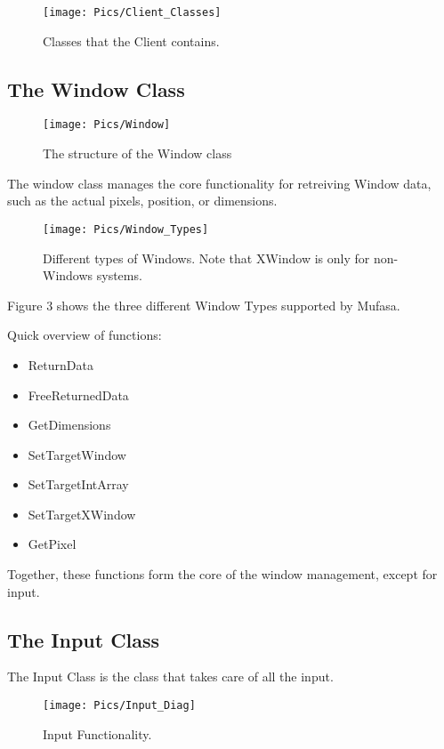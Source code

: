 \documentclass[a4paper, 10pt]{article}
\begin{document}
\begin{figure}[h]
	\texttt{[image: Pics/Client\_Classes]}
	\caption{Classes that the Client contains.}
\end{figure}

\pagebreak

\subsection{The Window Class}

\begin{figure}[h]
	\texttt{[image: Pics/Window]}
	\caption{The structure of the Window class}
\end{figure}

The window class manages the core functionality for retreiving Window data, such as the actual pixels, position, or dimensions.

\begin{figure}[h]
	\texttt{[image: Pics/Window\_Types]}
	\caption{Different types of Windows. Note that XWindow is only for non-Windows systems.}
\end{figure}

Figure 3 shows the three different Window Types supported by Mufasa.

Quick overview of functions:

\begin{itemize}
	\item ReturnData
	\item FreeReturnedData
	\item GetDimensions
	\item SetTargetWindow
	\item SetTargetIntArray
	\item SetTargetXWindow
	\item GetPixel
\end{itemize}

Together, these functions form the core of the window management, except for input.

\subsection{The Input Class}

The Input Class is the class that takes care of all the input.

\begin{figure}[h]
	\texttt{[image: Pics/Input\_Diag]}
	\caption{Input Functionality.}
\end{figure}
\end{document}
